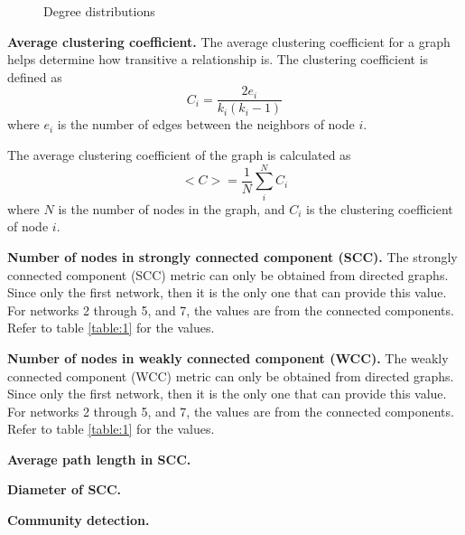\begin{figure}
    \qquad
    \caption{Degree distributions}
    \label{fig:4}
\end{figure}

\textbf{Average clustering coefficient.} The average clustering coefficient for a graph helps determine how transitive a relationship is. The clustering coefficient is defined as
\begin{equation}
    C_i = \frac{2e_i}{k_i(k_i-1)}
    \label{equation:clustering_coef}
\end{equation}
where $e_i$ is the number of edges between the neighbors of node $i$.

The average clustering coefficient of the graph is calculated as
\begin{equation}
    <C> = \frac{1}{N}\sum_{i}^{N}C_i
    \label{equation:avg_clustering_coef}
\end{equation}
where $N$ is the number of nodes in the graph, and $C_i$ is the clustering coefficient of node $i$.

\textbf{Number of nodes in strongly connected component (SCC).} The strongly connected component (SCC) metric can only be obtained from directed graphs. Since only the first network, then it is the only one that can provide this value. For networks 2 through 5, and 7, the values are from the connected components. Refer to table \ref{table:1} for the values.

\textbf{Number of nodes in weakly connected component (WCC).} The weakly connected component (WCC) metric can only be obtained from directed graphs. Since only the first network, then it is the only one that can provide this value. For networks 2 through 5, and 7, the values are from the connected components. Refer to table \ref{table:1} for the values.

\textbf{Average path length in SCC.}

\textbf{Diameter of SCC.}

\textbf{Community detection.}

